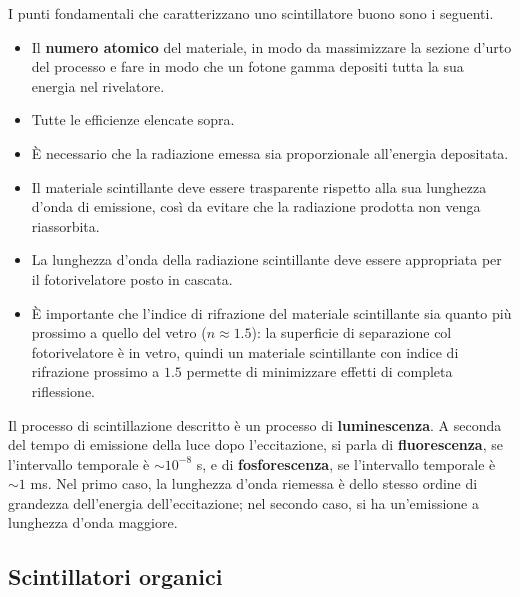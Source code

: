 \documentclass[11pt, a4paper]{scrartcl}
\theoremstyle{style}
\numberwithin{equation}{subsection}
\begin{document}
I punti fondamentali che caratterizzano uno scintillatore buono sono i seguenti.
\begin{itemize}
	\item Il \textbf{numero atomico} del materiale, in modo da massimizzare la sezione d'urto del processo e fare in modo che un fotone gamma depositi tutta la sua energia nel rivelatore.
	\item Tutte le efficienze elencate sopra.
	\item \`E necessario che la radiazione emessa sia proporzionale all'energia depositata.
	\item Il materiale scintillante deve essere trasparente rispetto alla sua lunghezza d'onda di emissione, cos\`i da evitare che la radiazione prodotta non venga riassorbita.
	\item La lunghezza d'onda della radiazione scintillante deve essere appropriata per il fotorivelatore posto in cascata.
	\item \`E importante che l'indice di rifrazione del materiale scintillante sia quanto pi\`u prossimo a quello del vetro ($n \approx 1.5$): la superficie di separazione col fotorivelatore \`e in vetro, quindi un materiale scintillante con indice di rifrazione prossimo a $1.5$ permette di minimizzare effetti di completa riflessione.
\end{itemize}
Il processo di scintillazione descritto \`e un processo di \textbf{luminescenza}.
A seconda del tempo di emissione della luce dopo l'eccitazione, si parla di \textbf{fluorescenza}, se l'intervallo temporale \`e $\sim 10^{-8}$ s, e di \textbf{fosforescenza}, se l'intervallo temporale \`e $\sim 1$ ms. 
Nel primo caso, la lunghezza d'onda riemessa \`e dello stesso ordine di grandezza dell'energia dell'eccitazione; nel secondo caso, si ha un'emissione a lunghezza d'onda maggiore.


\subsection{Scintillatori organici}
\end{document}
